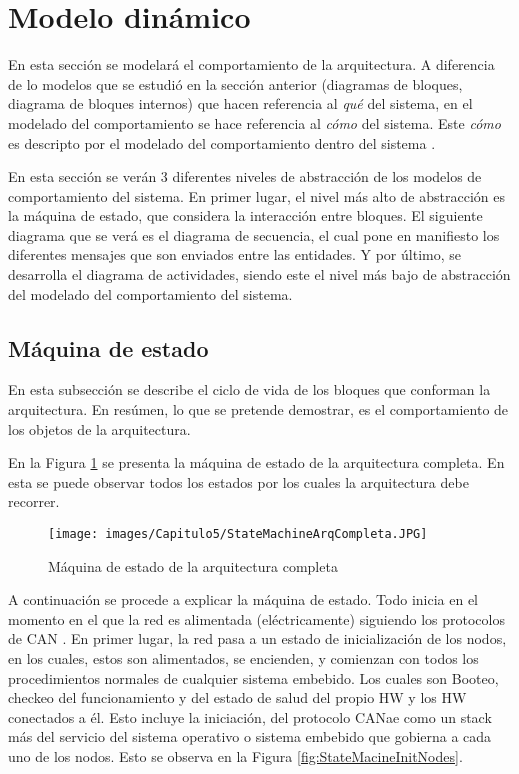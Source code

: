 \section{Modelo dinámico}\label{sec:modelo_dinamico}
En esta sección se modelará el comportamiento de la arquitectura.
A diferencia de lo modelos  que se estudió en la sección anterior (diagramas
de bloques, diagrama de bloques internos) que hacen referencia al
\textit{qué} del sistema, en el modelado del comportamiento se
hace referencia al \textit{cómo} del sistema. Este \textit{cómo}
es descripto por el modelado del comportamiento dentro del
sistema \citep{HoltPery}.

En esta sección se verán  3 diferentes niveles de abstracción
de los modelos de comportamiento del sistema. En primer lugar, el
nivel más alto de abstracción es la máquina de estado, que considera la
interacción entre bloques. El siguiente diagrama que se verá es
el diagrama de secuencia, el cual pone en manifiesto los diferentes
mensajes que son enviados entre las entidades. Y por último, se
desarrolla el diagrama de actividades, siendo este el nivel
más bajo de abstracción del modelado del comportamiento del sistema.

\subsection{Máquina de estado}
En esta subsección se describe el ciclo de vida de los
bloques que conforman la arquitectura. En resúmen, lo que se
pretende demostrar, es el comportamiento de los objetos de la
arquitectura.

En la Figura \ref{fig:StateMachineArqCompleta} se presenta la
máquina de estado de la arquitectura completa.  En esta se
puede observar todos los estados por los cuales la arquitectura
debe recorrer.

\begin{figure}[h!]
 \centering
 \texttt{[image: images/Capitulo5/StateMachineArqCompleta.JPG]}
  \caption{Máquina de estado de la arquitectura completa}
\label{fig:StateMachineArqCompleta}
\end{figure}

A continuación se procede a explicar la máquina de estado. Todo
inicia en el momento en el que la red es alimentada (eléctricamente)
siguiendo los protocolos de CAN \citep{can-ciaWEB}. En primer lugar, la
red pasa a un estado de inicialización de los nodos, en los cuales, estos
son alimentados, se encienden, y comienzan con todos los procedimientos
normales de cualquier sistema embebido. Los cuales son Booteo, checkeo del
funcionamiento y del estado de salud del propio \ac{HW} y los \ac{HW}
conectados a él. Esto incluye la iniciación, del protocolo CANae como
un stack más del servicio del sistema operativo o sistema embebido
que gobierna a cada uno de los nodos. Esto se observa en la Figura
\ref{fig:StateMacineInitNodes}.

